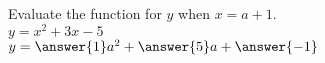 \documentclass{ximera}
\author{David Kish}
\begin{document}
\begin{exercise}
Evaluate the function for $y$ when $x=a+1$.\\
$y= x^2+ 3x-5$\\
$y= \answer{1}a^2+\answer{5}a+\answer{-1}$
\end{exercise}
\end{document}
